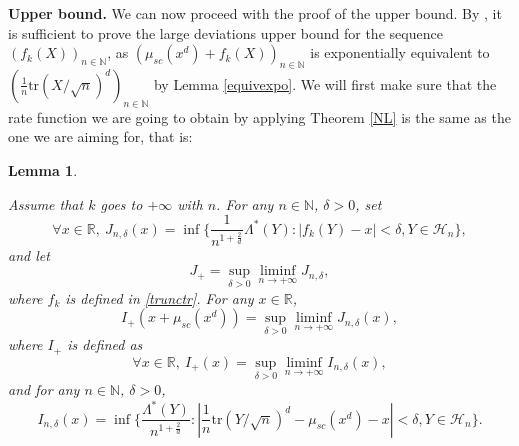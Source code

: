 \documentclass[aop,preprint]{imsart}
\newcommand\NN{\mathbb{N}}
\newcommand\RR{\mathbb{R}}
\newcommand\tr{\mathrm{tr}}
\numberwithin{equation}{section}
\theoremstyle{definition}
\theoremstyle{plain}
\newtheorem{Lem}[Def]{Lemma}
\theoremstyle{remark}
\begin{document}
 



\textbf{Upper bound. }We can now proceed with the proof of the  upper bound. 
By \cite[Theorem 4.2.13]{DZ}, it is sufficient to prove the large deviations upper bound for the sequence $(f_k(X))_{n\in \NN}$, as $(\mu_{sc}(x^d)+ f_k(X))_{n\in \NN}$ is exponentially equivalent to $( \frac{1}{n} \tr(X/\sqrt{n})^d)_{n\in \NN}$ by Lemma \ref{equivexpo}.  We will first make sure that the rate function we are going to obtain by applying Theorem \ref{NL} is the same as the one we are aiming for, that is:

\begin{Lem}\label{ratefunctruc}

Assume that $k$ goes to  $+\infty$ with $n$. For any $n\in \NN$, $\delta >0$, set
$$ \forall  x \in \RR, \ J_{n,\delta}(x) = \inf \big\{ \frac{1}{n^{1+\frac{2}{d}}} \Lambda^*(Y) : |f_k(Y)-x|<\delta , Y \in \mathcal{H}_n\big\},$$
and let
$$ J_+ =  \sup_{\delta>0} \liminf_{n\to +\infty} J_{n,\delta},$$
where $f_k$ is defined in \eqref{trunctr}. 
For any $x \in \RR$,
$$ I_+(x+\mu_{sc}(x^d)) = \sup_{\delta>0}  \liminf_{n\to +\infty} J_{n,\delta}(x),$$
where $I_+$ is defined as
$$\forall x \in \RR, \  I_+(x) =\sup_{\delta>0}\liminf_{n\to +\infty} I_{n,\delta}(x),$$
and for any $n\in \NN$, $\delta>0$,
$$ I_{n,\delta}(x) = \inf \Big\{ \frac{\Lambda^*(Y)}{n^{1+\frac{2}{d}}} : |\frac{1}{n} \tr (Y/\sqrt{n})^d - \mu_{sc}(x^d) - x| <\delta, Y \in \mathcal{H}_n \Big\}.$$ 
\end{Lem}
\end{document}
